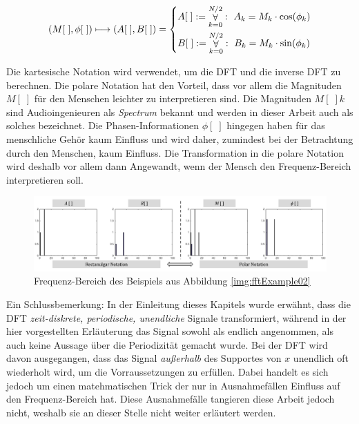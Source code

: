 \begin{equation}
(M[\;], \phi[\;]) \longmapsto (A[\;], B[\;])  =
\begin{dcases}
A[\;]  := \mathop{\forall}_{k = 0}^{N/2} :\ A_k= M_k \cdot \cos(\phi_k) \\
B[\;]  := \mathop{\forall}_{k = 0}^{N/2} :\ B_k = M_k \cdot \sin(\phi_k)
\end{dcases}
\label{eq:polarToRect}
\end{equation}

Die kartesische Notation wird verwendet, um die DFT und die inverse DFT zu berechnen. Die polare Notation hat den Vorteil, dass vor allem die Magnituden $M[\;]$ für den Menschen leichter zu interpretieren sind. Die Magnituden $M[\;]k$ sind Audioingenieuren als \emph{Spectrum} bekannt und werden in dieser Arbeit auch als solches bezeichnet. Die Phasen-Informationen $\phi[\;]$ hingegen haben für das menschliche Gehör kaum Einfluss und wird daher, zumindest bei der Betrachtung durch den Menschen, kaum Einfluss. \cite[Signals and transforms, S. 10 ]{ricardo_ceps} Die Transformation in die polare Notation wird deshalb vor allem dann Angewandt, wenn der Mensch den Frequenz-Bereich interpretieren soll. \cite[S. 164]{dspGuide}

\begin{figure}[h]
	\centering
	\includegraphics[width=1\textwidth]{bilder/rectToPolar03.png}
	\caption{Frequenz-Bereich des Beispiels aus Abbildung \ref{img:fftExample02}}
	\label{img:polarToRect02}
\end{figure}

Ein Schlussbemerkung: In der Einleitung dieses Kapitels wurde erwähnt, dass die DFT \emph{zeit-diskrete, periodische, unendliche} Signale transformiert, während in der hier vorgestellten Erläuterung das Signal sowohl als endlich angenommen, als auch keine Aussage über die Periodizität gemacht wurde. Bei der DFT wird davon ausgegangen, dass das Signal \emph{außerhalb} des Supportes von $x$ unendlich oft wiederholt wird, um die Vorraussetzungen zu erfüllen. Dabei handelt es sich jedoch um einen \glqq matehmatischen Trick \grqq{} der nur in Ausnahmefällen Einfluss auf den Frequenz-Bereich hat. Diese Ausnahmefälle tangieren diese Arbeit jedoch nicht, weshalb sie an dieser Stelle nicht weiter erläutert werden.\cite[S. 145]{dspGuide}

